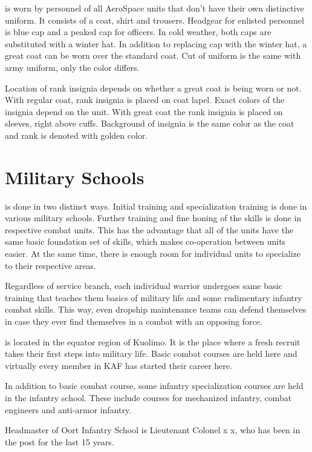 \documentclass{tufte-book}
\begin{document}
 is worn by personnel of all
AeroSpace units that don't have their own distinctive uniform. It consists of
a coat, shirt and trousers. Headgear for enlisted personnel is blue cap and
a peaked cap for officers. In cold weather, both caps are substituted with
a winter hat. In addition to replacing cap with the winter hat, a great coat
can be worn over the standard coat. Cut of uniform is the same with army
uniform, only the color differs.

Location of rank insignia depends on whether a great coat is being worn or
not. With regular coat, rank insignia is placed on coat lapel. Exact colors
of the insignia depend on the unit. With great coat the rank insignia is
placed on sleeves, right above cuffs. Background of insignia is the same color
as the coat and rank is denoted with golden color.

\section{Military Schools}
\label{sc:military_schools}

 is done in two distinct ways. Initial training and
specialization training is done in various military schools. Further training
and fine honing of the skills is done in respective combat units. This has the
advantage that all of the units have the same basic foundation set of skills,
which makes co-operation between units easier. At the same time, there is
enough room for individual units to specialize to their respective areas.

Regardless of service branch, each individual warrior undergoes same basic
training that teaches them basics of military life and some rudimentary
infantry combat skills. This way, even dropship maintenance teams can defend
themselves in case they ever find themselves in a combat with an opposing
force.

 is located in the equator region of Kuolimo.
It is the place where a fresh recruit takes their first steps into military
life. Basic combat courses are held here and virtually every member in KAF
has started their career here.

In addition to basic combat course, some infantry specialization courses are
held in the infantry school. These include courses for mechanized infantry,
combat engineers and anti-armor infantry.

Headmaster of Oort Infantry School is Lieutenant Colonel x x,
who has been in the post for the last 15 years.
\end{document}
